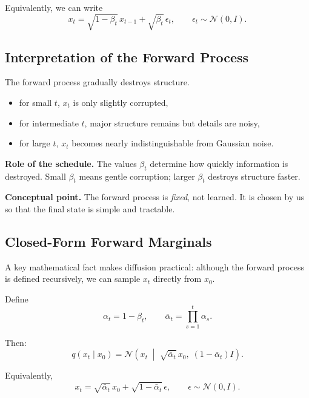 \noindent
Equivalently, we can write
\[
x_t = \sqrt{1-\beta_t}\,x_{t-1} + \sqrt{\beta_t}\,\epsilon_t,
\qquad
\epsilon_t \sim \mathcal{N}(0,I).
\]

\subsection{Interpretation of the Forward Process}

The forward process gradually destroys structure.

\begin{itemize}
    \item for small $t$, $x_t$ is only slightly corrupted,
    \item for intermediate $t$, major structure remains but details are noisy,
    \item for large $t$, $x_t$ becomes nearly indistinguishable from Gaussian noise.
\end{itemize}

\medskip

\noindent
\textbf{Role of the schedule.}
The values $\beta_t$ determine how quickly information is destroyed. Small $\beta_t$ means gentle corruption; larger $\beta_t$ destroys structure faster.

\medskip

\noindent
\textbf{Conceptual point.}
The forward process is \emph{fixed}, not learned. It is chosen by us so that the final state is simple and tractable.

\subsection{Closed-Form Forward Marginals}

A key mathematical fact makes diffusion practical: although the forward process is defined recursively, we can sample $x_t$ directly from $x_0$.

\medskip

\noindent
Define
\[
\alpha_t = 1-\beta_t,
\qquad
\bar{\alpha}_t = \prod_{s=1}^t \alpha_s.
\]

Then:
\[
q(x_t \mid x_0)
=
\mathcal{N}\!\left(
x_t \;\middle|\; \sqrt{\bar{\alpha}_t}\,x_0,\; (1-\bar{\alpha}_t)I
\right).
\]

\medskip

\noindent
Equivalently,
\[
x_t = \sqrt{\bar{\alpha}_t}\,x_0 + \sqrt{1-\bar{\alpha}_t}\,\epsilon,
\qquad
\epsilon \sim \mathcal{N}(0,I).
\]

\medskip

